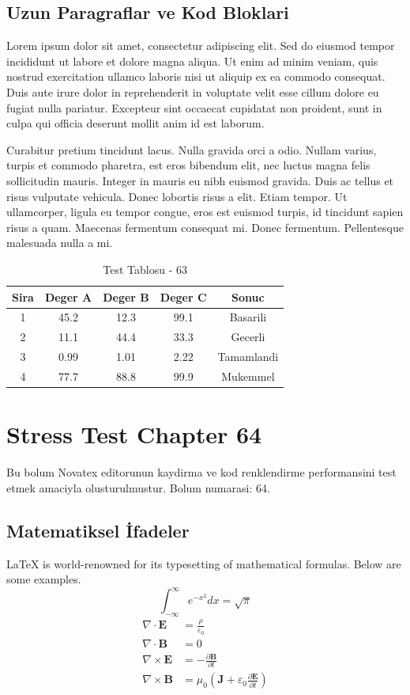 \documentclass[12pt,a4paper]{article}
\begin{document}
\subsection{Uzun Paragraflar ve Kod Bloklari}
Lorem ipsum dolor sit amet, consectetur adipiscing elit. Sed do eiusmod tempor incididunt ut labore et dolore magna aliqua. Ut enim ad minim veniam, quis nostrud exercitation ullamco laboris nisi ut aliquip ex ea commodo consequat. Duis aute irure dolor in reprehenderit in voluptate velit esse cillum dolore eu fugiat nulla pariatur. Excepteur sint occaecat cupidatat non proident, sunt in culpa qui officia deserunt mollit anim id est laborum.

Curabitur pretium tincidunt lacus. Nulla gravida orci a odio. Nullam varius, turpis et commodo pharetra, est eros bibendum elit, nec luctus magna felis sollicitudin mauris. Integer in mauris eu nibh euismod gravida. Duis ac tellus et risus vulputate vehicula. Donec lobortis risus a elit. Etiam tempor. Ut ullamcorper, ligula eu tempor congue, eros est euismod turpis, id tincidunt sapien risus a quam. Maecenas fermentum consequat mi. Donec fermentum. Pellentesque malesuada nulla a mi.

\begin{table}[h!]
\centering
\begin{tabular}{|c|c|c|c|c|}
\hline
\textbf{Sira} & \textbf{Deger A} & \textbf{Deger B} & \textbf{Deger C} & \textbf{Sonuc} \\
\hline
1 & 45.2 & 12.3 & 99.1 & Basarili \\
2 & 11.1 & 44.4 & 33.3 & Gecerli \\
3 & 0.99 & 1.01 & 2.22 & Tamamlandi \\
4 & 77.7 & 88.8 & 99.9 & Mukemmel \\
\hline
\end{tabular}
\caption{Test Tablosu - 63}
\end{table}

\newpage
\section{Stress Test Chapter 64}
Bu bolum Novatex editorunun kaydirma ve kod renklendirme performansini test etmek amaciyla olusturulmustur. Bolum numarasi: 64.

\subsection{Matematiksel İfadeler}
\LaTeX{} is world-renowned for its typesetting of mathematical formulas. Below are some examples.
\begin{equation}
\int_{-\infty}^{\infty} e^{-x^2} dx = \sqrt{\pi}
\end{equation}
\begin{align}
\nabla \cdot \mathbf{E} &= \frac{\rho}{\varepsilon_0} \\
\nabla \cdot \mathbf{B} &= 0 \\
\nabla \times \mathbf{E} &= -\frac{\partial \mathbf{B}}{\partial t} \\
\nabla \times \mathbf{B} &= \mu_0\left(\mathbf{J} + \varepsilon_0 \frac{\partial \mathbf{E}}{\partial t}\right)
\end{align}
\end{document}

